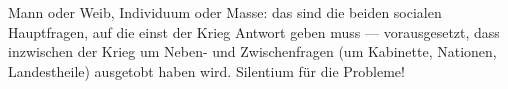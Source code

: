 Mann oder Weib, Individuum oder Masse: das sind die beiden socialen Hauptfragen, auf die einst der Krieg Antwort geben muss — vorausgesetzt, dass inzwischen der Krieg um Neben- und Zwischenfragen (um Kabinette, Nationen, Landestheile) ausgetobt haben wird. Silentium für die  Probleme!
\par

